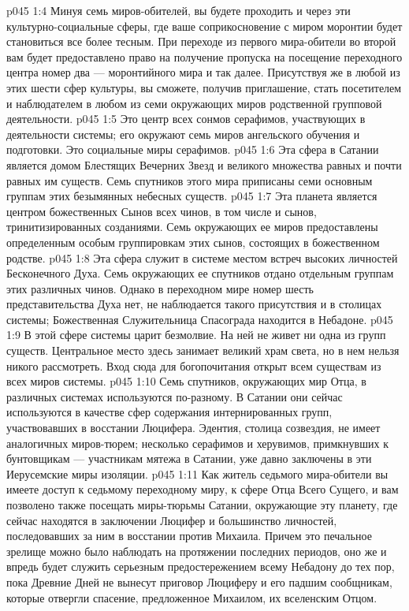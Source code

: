 \vs p045 1:4 Минуя семь миров\hyp{}обителей, вы будете проходить и через эти культурно\hyp{}социальные сферы, где ваше соприкосновение с миром моронтии будет становиться все более тесным. При переходе из первого мира\hyp{}обители во второй вам будет предоставлено право на получение пропуска на посещение переходного центра номер два --- моронтийного мира и так далее. Присутствуя же в любой из этих шести сфер культуры, вы сможете, получив приглашение, стать посетителем и наблюдателем в любом из семи окружающих миров родственной групповой деятельности.
\vs p045 1:5 \pc {} Это центр всех сонмов серафимов, участвующих в деятельности системы; его окружают семь миров ангельского обучения и подготовки. Это социальные миры серафимов.
\vs p045 1:6 \pc {} Эта сфера в Сатании является домом Блестящих Вечерних Звезд и великого множества равных и почти равных им существ. Семь спутников этого мира приписаны семи основным группам этих безымянных небесных существ.
\vs p045 1:7 \pc {} Эта планета является центром божественных Сынов всех чинов, в том числе и сынов, тринитизированных созданиями. Семь окружающих ее миров предоставлены определенным особым группировкам этих сынов, состоящих в божественном родстве.
\vs p045 1:8 \pc {} Эта сфера служит в системе местом встреч высоких личностей Бесконечного Духа. Семь окружающих ее спутников отдано отдельным группам этих различных чинов. Однако в переходном мире номер шесть представительства Духа нет, не наблюдается такого присутствия и в столицах системы; Божественная Служительница Спасограда находится  в Небадоне.
\vs p045 1:9 \pc {} В этой сфере системы царит безмолвие. На ней не живет ни одна из групп существ. Центральное место здесь занимает великий храм света, но в нем нельзя никого рассмотреть. Вход сюда для богопочитания открыт всем существам из всех миров системы.
\vs p045 1:10 Семь спутников, окружающих мир Отца, в различных системах используются по\hyp{}разному. В Сатании они сейчас используются в качестве сфер содержания интернированных групп, участвовавших в восстании Люцифера. Эдентия, столица созвездия, не имеет аналогичных миров\hyp{}тюрем; несколько серафимов и херувимов, примкнувших к бунтовщикам --- участникам мятежа в Сатании, уже давно заключены в эти Иерусемские миры изоляции.
\vs p045 1:11 Как житель седьмого мира\hyp{}обители вы имеете доступ к седьмому переходному миру, к сфере Отца Всего Сущего, и вам позволено также посещать миры\hyp{}тюрьмы Сатании, окружающие эту планету, где сейчас находятся в заключении Люцифер и большинство личностей, последовавших за ним в восстании против Михаила. Причем это печальное зрелище можно было наблюдать на протяжении последних периодов, оно же и впредь будет служить серьезным предостережением всему Небадону до тех пор, пока Древние Дней не вынесут приговор Люциферу и его падшим сообщникам, которые отвергли спасение, предложенное Михаилом, их вселенским Отцом.
